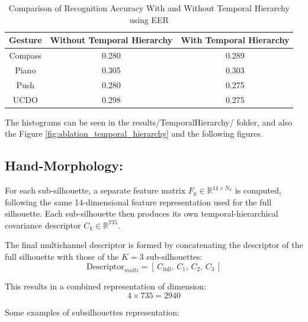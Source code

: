 \begin{table}[H]
    \centering
    \begin{tabular}{|c|c|c|}
        \hline
        \textbf{Gesture} & \textbf{Without Temporal Hierarchy} & \textbf{With Temporal Hierarchy} \\
        \hline
        Compass & 0.280 & 0.289 \\
        Piano & 0.305 & 0.303 \\
        Push & 0.280 & 0.275 \\
        UCDO & 0.298 & 0.275 \\
        \hline
    \end{tabular}
    \caption{Comparison of Recognition Accuracy With and Without Temporal Hierarchy using EER}
    \label{tab:temporal_hierarchy_comparison}
\end{table}
The histograms can be seen in the results/TemporalHierarchy/ folder, and also the Figure \ref{fig:ablation_temporal_hierarchy} and the following figures.


\subsection{Hand-Morphology:}

For each sub-silhouette, a separate feature matrix $F_k \in \mathbb{R}^{14 \times N_k}$ is computed, following the same 14-dimensional feature representation used for the full silhouette.  
Each sub-silhouette then produces its own temporal-hierarchical covariance descriptor $C_k \in \mathbb{R}^{735}$.

The final multichannel descriptor is formed by concatenating the descriptor of the full silhouette with those of the $K=3$ sub-silhouettes:
\[
\text{Descriptor}_{multi} = [\, C_{\text{full}},\, C_1,\, C_2,\, C_3 \,]
\]

This results in a combined representation of dimension:
\[
4 \times 735 = 2940
\]

Some examples of subsilhouettes representation:

